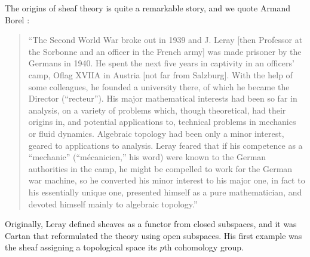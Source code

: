 \documentclass[../../thesis.tex]{subfiles}
\begin{document}
The origins of sheaf theory is quite a remarkable story, and we quote Armand Borel \cite{Borel}:
\begin{quotation}
    ``The Second World War broke out in 1939 and J. Leray [then Professor at the Sorbonne and an officer in the French army] was made prisoner by the Germans in 1940.
    He spent the next five years in captivity in an officers’ camp, Oflag XVIIA in Austria [not far from Salzburg].
    With the help of some colleagues, he founded a university there, of which he became the Director (“recteur”).
    His major mathematical interests had been so far in analysis, on a variety of problems which, though theoretical, had their origins in, and potential applications to, technical problems in mechanics or fluid dynamics.
    Algebraic topology had been only a minor interest, geared to applications to analysis. Leray feared that if his competence as a “mechanic” (“mécanicien,” his word) were known to the German authorities in the camp, he might be compelled to work for the German war machine, so he converted his minor interest to his major one, in fact to his essentially unique one, presented himself as a pure mathematician, and devoted himself mainly to algebraic topology.''
\end{quotation}
Originally, Leray defined sheaves as a functor from closed subspaces, and it was Cartan that reformulated the theory using open subspaces.\cite{H.Miller}
His first example was the sheaf assigning a topological space its $p$th cohomology group.
\end{document}
